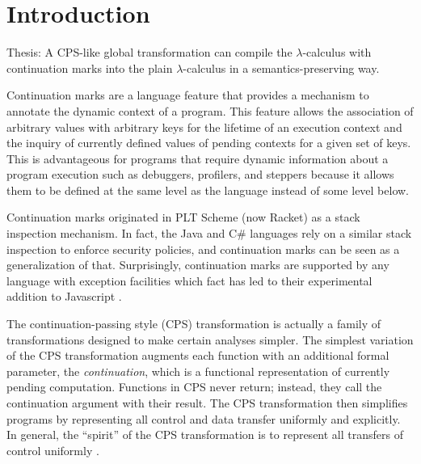 \documentclass[ms]{byuprop}
\title{\Title}
\author{\Author}
\begin{document}
\maketitle



\section{Introduction}


Thesis: A CPS-like global transformation can compile the $\lambda$-calculus with
continuation marks into the plain $\lambda$-calculus in a semantics-preserving way.

Continuation marks \cite{clements2006portable} are a language feature that provides a
mechanism to annotate the dynamic context of a program. This feature allows the
association of arbitrary values with arbitrary keys for the lifetime of an execution
context and the inquiry of currently defined values of pending contexts for a given set of
keys. This is advantageous for programs that require dynamic information about a program
execution such as debuggers, profilers, and steppers because it allows them to be defined
at the same level as the language instead of some level below.

Continuation marks originated in PLT Scheme (now Racket) \cite{plt-tr1} as a stack 
inspection mechanism. In fact, the Java and C\# languages rely on a similar stack 
inspection to enforce security policies, and continuation marks can be seen as a 
generalization of that. Surprisingly, continuation marks are supported by any language 
with exception facilities \cite{pettyjohn2005continuations} which fact has led to their 
experimental addition to Javascript \cite{clements2008implementing}.

The continuation-passing style (CPS) transformation is actually a family of 
transformations designed to make certain analyses simpler. The simplest variation of the 
CPS transformation augments each function with an additional formal parameter, the 
\emph{continuation}, which is a functional representation of currently pending 
computation. Functions in CPS never return; instead, they call the continuation argument 
with their result. The CPS transformation then simplifies programs by representing all 
control and data transfer uniformly and explicitly. In general, the ``spirit'' of the 
CPS transformation is to represent all transfers of control uniformly \cite{sabry1994formal}.
\end{document}
